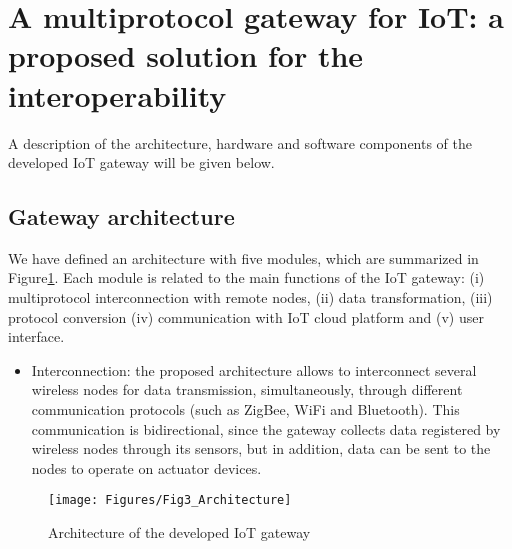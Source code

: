 \section{A multiprotocol gateway for IoT: a proposed solution for the interoperability}
\label{sec:5.3}

A description of the architecture, hardware and software components of the developed IoT gateway will be given below. 
\subsection{Gateway architecture}

We have defined an architecture with five modules, which are summarized in Figure\ref{ch5_fig:3}. Each module is related to the main functions of the IoT gateway: (i) multiprotocol interconnection with remote nodes, (ii) data transformation, (iii) protocol conversion (iv) communication with IoT cloud platform and (v) user interface.

\begin{itemize}
\item Interconnection: the proposed architecture allows to interconnect several wireless nodes for data transmission, simultaneously, through different communication protocols (such as ZigBee, WiFi and Bluetooth). This communication is bidirectional, since the gateway collects data registered by wireless nodes through its sensors, but in addition, data can be sent to the nodes to operate on actuator devices.
\end{itemize}

\begin{figure}[ht!]
\centering
\texttt{[image: Figures/Fig3\_Architecture]}
\caption{Architecture of the developed IoT gateway}
\label{ch5_fig:3}       %
\end{figure}

